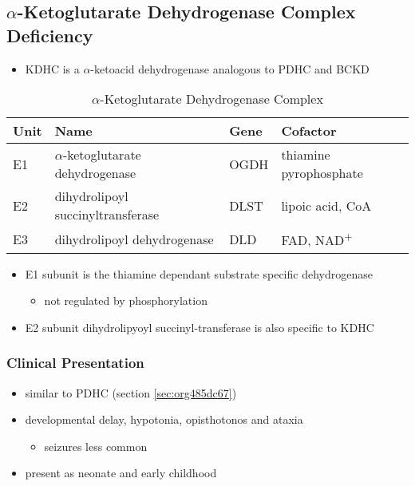 \documentclass[12pt]{scrartcl}
\begin{document}
\subsection{\(\alpha\)-Ketoglutarate Dehydrogenase Complex Deficiency}
\label{sec:org6e6061f}
\begin{itemize}
\item KDHC is a \(\alpha\)-ketoacid dehydrogenase analogous to PDHC and BCKD
\end{itemize}


\begin{table}[htbp]
\caption{\label{tab:org022e366}\(\alpha\)-Ketoglutarate Dehydrogenase Complex}
\centering
\begin{tabular}{llll}
Unit & Name & Gene & Cofactor\\
\hline
E1 & \(\alpha\)-ketoglutarate dehydrogenase & OGDH & thiamine pyrophosphate\\
E2 & dihydrolipoyl succinyltransferase & DLST & lipoic acid, CoA\\
E3 & dihydrolipoyl dehydrogenase & DLD & FAD, NAD\textsuperscript{+}\\
\end{tabular}
\end{table}

\begin{itemize}
\item E1 subunit is the thiamine dependant substrate specific dehydrogenase
\begin{itemize}
\item not regulated by phosphorylation
\end{itemize}
\item E2 subunit dihydrolipyoyl succinyl-transferase is also specific to KDHC
\end{itemize}

\subsubsection{Clinical Presentation}
\label{sec:orge95f970}
\begin{itemize}
\item similar to PDHC (section \ref{sec:org485dc67})
\item developmental delay, hypotonia, opisthotonos and ataxia
\begin{itemize}
\item seizures less common
\end{itemize}
\item present as neonate and early childhood
\end{itemize}
\end{document}
